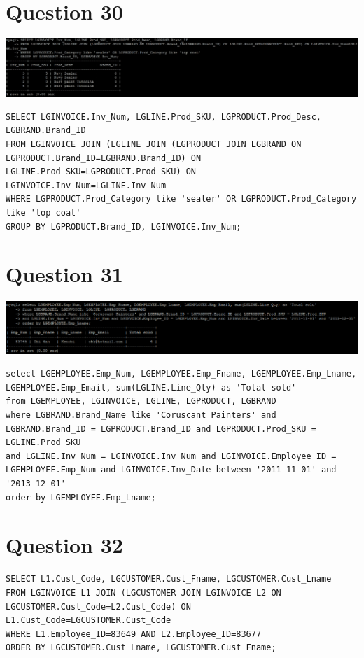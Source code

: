 \documentclass[a4paper,10pt]{article}
\begin{document}
\section {Question 30}
\includegraphics{Queries/Question_30/Q30_screenshot.jpg}
\lstset{
            language=SQL,
            breaklines=true
            }
        \begin{lstlisting}[frame=single]
        SELECT LGINVOICE.Inv_Num, LGLINE.Prod_SKU, LGPRODUCT.Prod_Desc, LGBRAND.Brand_ID
FROM LGINVOICE JOIN (LGLINE JOIN (LGPRODUCT JOIN LGBRAND ON LGPRODUCT.Brand_ID=LGBRAND.Brand_ID) ON LGLINE.Prod_SKU=LGPRODUCT.Prod_SKU) ON LGINVOICE.Inv_Num=LGLINE.Inv_Num
WHERE LGPRODUCT.Prod_Category like 'sealer' OR LGPRODUCT.Prod_Category like 'top coat'
GROUP BY LGPRODUCT.Brand_ID, LGINVOICE.Inv_Num;
        \end{lstlisting}
\section {Question 31}
\includegraphics{Queries/Question_31/Question_31_screenshot.PNG}
\lstset{
            language=SQL,
            breaklines=true
            }
        \begin{lstlisting}[frame=single]
        select LGEMPLOYEE.Emp_Num, LGEMPLOYEE.Emp_Fname, LGEMPLOYEE.Emp_Lname, LGEMPLOYEE.Emp_Email, sum(LGLINE.Line_Qty) as 'Total sold' 
from LGEMPLOYEE, LGINVOICE, LGLINE, LGPRODUCT, LGBRAND 
where LGBRAND.Brand_Name like 'Coruscant Painters' and LGBRAND.Brand_ID = LGPRODUCT.Brand_ID and LGPRODUCT.Prod_SKU = LGLINE.Prod_SKU 
and LGLINE.Inv_Num = LGINVOICE.Inv_Num and LGINVOICE.Employee_ID = LGEMPLOYEE.Emp_Num and LGINVOICE.Inv_Date between '2011-11-01' and '2013-12-01' 
order by LGEMPLOYEE.Emp_Lname;
        \end{lstlisting}
\section {Question 32}
\lstset{
            language=SQL,
            breaklines=true
            }
        \begin{lstlisting}[frame=single]
        SELECT L1.Cust_Code, LGCUSTOMER.Cust_Fname, LGCUSTOMER.Cust_Lname
FROM LGINVOICE L1 JOIN (LGCUSTOMER JOIN LGINVOICE L2 ON LGCUSTOMER.Cust_Code=L2.Cust_Code) ON L1.Cust_Code=LGCUSTOMER.Cust_Code
WHERE L1.Employee_ID=83649 AND L2.Employee_ID=83677
ORDER BY LGCUSTOMER.Cust_Lname, LGCUSTOMER.Cust_Fname;

        \end{lstlisting}
\end{document}
